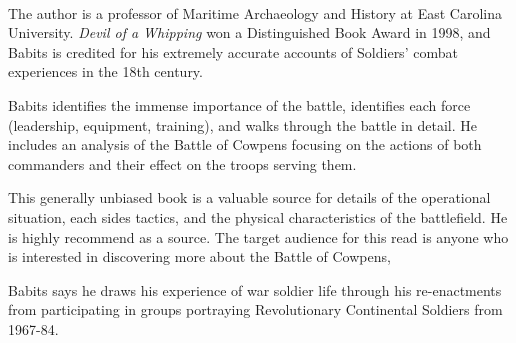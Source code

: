 \\
The author is a professor of Maritime Archaeology and History at East
Carolina University.  \emph{Devil of a Whipping} won a Distinguished Book Award
in 1998, and Babits is credited for his extremely accurate accounts of
Soldiers' combat experiences in the 18th century.

Babits identifies the immense importance of the battle, identifies each force
(leadership, equipment, training), and walks through the battle in detail.
He includes an analysis of the Battle of Cowpens focusing on the actions of both
commanders and their effect on the troops serving them.

This generally unbiased book is a valuable source for details of the operational
situation, each sides tactics, and the physical characteristics of the
battlefield. He is highly recommend as a source.
The target audience for this read is anyone who is interested in discovering
more about the Battle of Cowpens,

Babits says he draws his experience of war
soldier life through his re-enactments from participating in groups portraying
Revolutionary Continental Soldiers from 1967-84.






